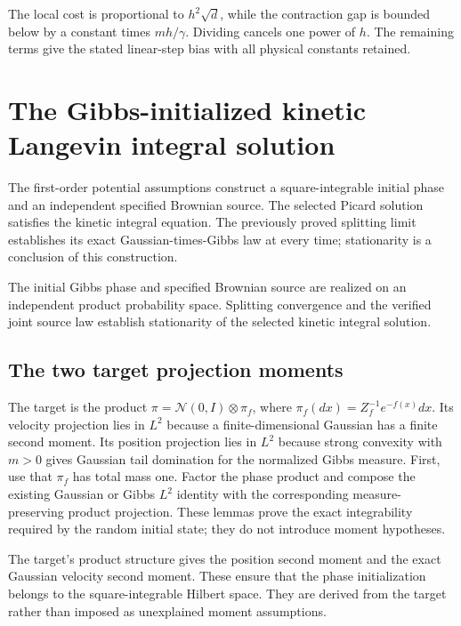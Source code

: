 \documentclass[11pt,a4paper]{report}
\begin{document}
The local cost is proportional to \(h^2\sqrt d\), while the contraction gap is bounded below by a constant times \(mh/\gamma\). Dividing cancels one power of \(h\). The remaining terms give the stated linear-step bias with all physical constants retained.

\section{\texorpdfstring{The Gibbs-initialized kinetic Langevin integral solution}{The Gibbs-initialized kinetic Langevin integral solution}}
\label{proof-module-KineticLangevin-CanonicalStationarity-lean}


The first-order potential assumptions construct a square-integrable initial phase and an independent specified Brownian source. The selected Picard solution satisfies the kinetic integral equation. The previously proved splitting limit establishes its exact Gaussian-times-Gibbs law at every time; stationarity is a conclusion of this construction.



The initial Gibbs phase and specified Brownian source are realized on an independent product probability space. Splitting convergence and the verified joint source law establish stationarity of the selected kinetic integral solution.

\subsection{\texorpdfstring{The two target projection moments}{The two target projection moments}}
\label{report-step-KineticLangevin-CanonicalStationarity-lean-1}


The target is the product \(\pi=\mathcal N(0,I)\otimes\pi_f\), where \(\pi_f(dx)=Z_f^{-1}e^{-f(x)}dx\). Its velocity projection lies in \(L^{2}\) because a finite-dimensional Gaussian has a finite second moment. Its position projection lies in \(L^{2}\) because strong convexity with \(m>0\) gives Gaussian tail domination for the normalized Gibbs measure. First, use that \(\pi_f\) has total mass one. Factor the phase product and compose the existing Gaussian or Gibbs \(L^{2}\) identity with the corresponding measure-preserving product projection. These lemmas prove the exact integrability required by the random initial state; they do not introduce moment hypotheses.



The target’s product structure gives the position second moment and the exact Gaussian velocity second moment. These ensure that the phase initialization belongs to the square-integrable Hilbert space. They are derived from the target rather than imposed as unexplained moment assumptions.
\end{document}
